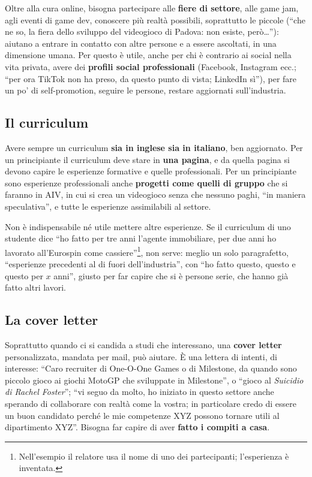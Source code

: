 Oltre alla cura online, bisogna partecipare alle \textbf{fiere di settore},
alle game jam, agli eventi di game dev, conoscere più realtà possibili,
soprattutto le piccole (``che ne so, la fiera dello sviluppo del videogioco
di Padova: non esiste, però\dots''): aiutano a entrare in contatto con altre
persone e a essere ascoltati, in una dimensione umana. Per questo è utile,
anche per chi è contrario ai social nella vita privata, avere dei
\textbf{profili social professionali} (Facebook, Instagram ecc.; ``per ora
TikTok non ha preso, da questo punto di vista; LinkedIn sì''), per fare un po'
di self-promotion, seguire le persone, restare aggiornati sull'industria.

\subsection{Il curriculum}

Avere sempre un curriculum \textbf{sia in inglese sia in italiano}, ben
aggiornato. Per un principiante il curriculum deve stare in \textbf{una
pagina}, e da quella pagina si devono capire le esperienze formative e quelle
professionali. Per un principiante sono esperienze professionali anche
\textbf{progetti come quelli di gruppo} che si faranno in AIV, in cui si crea
un videogioco senza che nessuno paghi, ``in maniera speculativa'', e tutte le
esperienze assimilabili al settore.

Non è indispensabile né utile mettere altre esperienze. Se il curriculum di
uno studente dice ``ho fatto per tre anni l'agente immobiliare, per due anni
ho lavorato all'Eurospin come cassiere''\footnote{Nell'esempio il relatore usa
il nome di uno dei partecipanti; l'esperienza è inventata.}, non serve: meglio
un solo paragrafetto, ``esperienze precedenti al di fuori dell'industria'',
con ``ho fatto questo, questo e questo per $x$ anni'', giusto per far capire
che si è persone serie, che hanno già fatto altri lavori.

\subsection{La cover letter}

Soprattutto quando ci si candida a studi che interessano, una \textbf{cover
letter} personalizzata, mandata per mail, può aiutare. È una lettera di
intenti, di interesse: ``Caro recruiter di One-O-One Games o di Milestone, da
quando sono piccolo gioco ai giochi MotoGP che sviluppate in Milestone'', o
``gioco al \emph{Suicidio di Rachel Foster}''; ``vi seguo da molto, ho
iniziato in questo settore anche sperando di collaborare con realtà come la
vostra; in particolare credo di essere un buon candidato perché le mie
competenze XYZ possono tornare utili al dipartimento XYZ''. Bisogna far capire
di aver \textbf{fatto i compiti a casa}.

